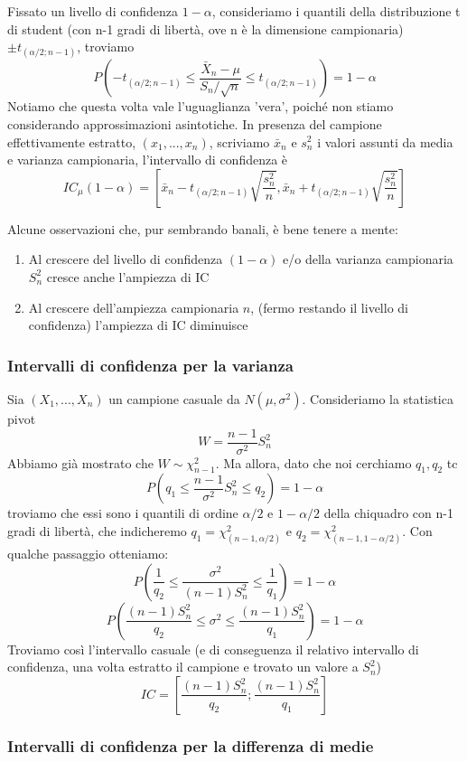 Fissato un livello di confidenza $1-\alpha$, consideriamo i quantili della distribuzione t di student (con n-1 gradi di libertà, ove n è la dimensione campionaria) 
$\pm t_{(\alpha/2;n-1)}$, 
troviamo $$ P\left(-t_{(\alpha/2;n-1)} \leq \frac{\bar{X}_n - \mu}{S_n / \sqrt{n}}
 \leq t_{(\alpha/2;n-1)}\right) = 1 - \alpha $$
Notiamo che questa volta vale l'uguaglianza 'vera', poiché non stiamo considerando approssimazioni asintotiche. 
In presenza del campione effettivamente estratto, $(x_1,...,x_n)$, 
scriviamo $\bar{x}_n$ e $s^2_n$ i valori assunti da media e varianza campionaria,
l'intervallo di confidenza è $$IC_{\mu}(1-\alpha)=
\left[\bar{x}_n -
 t_{(\alpha / 2;n-1)} 
 \sqrt{\frac{s^2_n}{n}},
  \bar{x}_n + t_{(\alpha / 2;n-1)}\sqrt{\frac{s^2_n}{n}}\right]$$
\begin{oss}
Alcune osservazioni che, pur sembrando banali, è bene tenere a mente:
\begin{enumerate}
\item Al crescere del livello di confidenza $(1-\alpha)$ e/o della varianza campionaria $S^2_n$ cresce anche l'ampiezza di IC
\item Al crescere dell'ampiezza campionaria $n$, (fermo restando il livello di confidenza) l'ampiezza di IC diminuisce
\end{enumerate}
\end{oss}

\subsubsection{Intervalli di confidenza per la varianza}
Sia $(X_1,...,X_n)$ un campione casuale da $N(\mu,\sigma^2)$.
Consideriamo la statistica pivot $$W=\frac{n-1}{\sigma^2} S^2_n$$ Abbiamo già mostrato che $W \sim \chi^2_{n-1}$. 
Ma allora, dato che noi cerchiamo $q_1,q_2$ tc $$P(q_1 \leq \frac{n-1}{\sigma^2} S^2_n \leq q_2)=1-\alpha$$ troviamo che essi sono i quantili di ordine $\alpha / 2$ e $1 - \alpha / 2$ della chiquadro con n-1 gradi di libertà, che indicheremo $q_1=\chi^2_{(n-1,\alpha / 2)}$ e $q_2=\chi^2_{(n-1,1 - \alpha / 2)}$.
Con qualche passaggio otteniamo:
$$P(\frac{1}{q_2} \leq \frac{\sigma^2}{(n-1) S^2_n} \leq \frac{1}{q_1})=1-\alpha$$
$$P(\frac{(n-1) S^2_n}{q_2} \leq \sigma^2 \leq \frac{(n-1) S^2_n}{q_1})=1-\alpha$$
Troviamo così l'intervallo casuale (e di conseguenza il relativo intervallo di confidenza, una volta estratto il campione e trovato un valore a $S^2_n$) $$IC=\left[ \frac{(n-1)S^2_n}{q_2};\frac{(n-1)S^2_n}{q_1} \right]$$

\subsubsection{Intervalli di confidenza per la differenza di medie}

